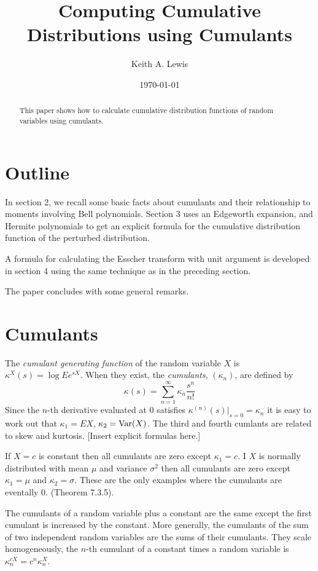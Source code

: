 \documentclass[fleqn]{amsart}
\title{Computing Cumulative Distributions using Cumulants}
\author{Keith A. Lewis}
\date{\today}
\newcommand{\Var}{\mathop{\rm{Var}}}
\theoremstyle{definition}
\begin{document}
\maketitle
\begin{abstract}
This paper shows how to calculate cumulative distribution functions
of random variables using cumulants.
\end{abstract}

\section{Outline}

In section 2, we recall some basic facts about cumulants and their
relationship to moments involving Bell polynomials.  Section 3 uses an
Edgeworth expansion, and Hermite polynomials to get an explicit formula
for the cumulative distribution function of the perturbed distribution.

A formula for calculating the Esscher transform with unit argument is
developed in section 4 using the same technique as in the preceding
section.

The paper concludes with some general remarks.

\section{Cumulants}

The {\em cumulant generating function} of the random variable \(X\)
is \(\kappa^X(s) = \log Ee^{sX}\).
When they exist, the {\em cumulants}, \((\kappa_n)\),
are defined by
\[
\kappa(s) = \sum_{n=1}^\infty \kappa_n \frac{s^n}{n!}
\]
Since the \(n\)-th derivative evaluated at \(0\)
satisfies \(\kappa^{(n)}(s)|_{s = 0} = \kappa_n\) 
it is easy to
work out that
\(\kappa_1 = EX\), \(\kappa_2 = \Var(X)\). The third and fourth 
cumlants are related to skew and kurtosis. [Insert explicit formulas here.]

If \(X = c\) is constant then all cumulants are zero except \(\kappa_1 = c\).
I \(X\) is normally distributed with mean \(\mu\) and variance \(\sigma^2\)
then all cumulants are zero except \(\kappa_1 = \mu\) and
\(\kappa_2 = \sigma\). These are the only examples where the
cumulants are eventally 0. \cite{Luk1970} (Theorem 7.3.5).

The cumulants of a random variable plus a constant are the 
same except the first cumulant is increased by the constant.
More generally, the cumulants of the sum of two independent 
random variables are the sums of their cumulants.
They scale homogeneously, the \(n\)-th cumulant of a constant
times a random variable is
\(\kappa^{cX}_n = c^n\kappa^X_n\).
\end{document}
